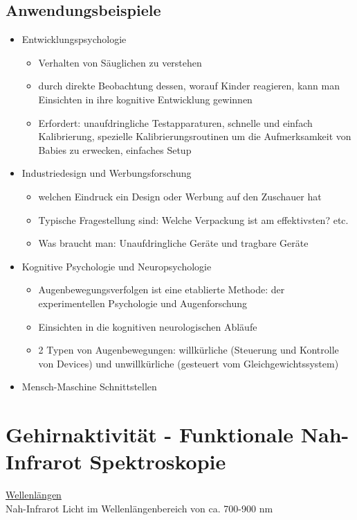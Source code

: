 \documentclass[a4paper,10pt,oneside]{article}
\begin{document}
\subsection{Anwendungsbeispiele}
	\begin{itemize}
		\item Entwicklungspsychologie
			\begin{itemize}
				\item Verhalten von Säuglichen zu verstehen
				\item durch direkte Beobachtung dessen, worauf Kinder reagieren, kann man Einsichten in ihre kognitive Entwicklung gewinnen
				\item Erfordert: unaufdringliche Testapparaturen, schnelle und einfach Kalibrierung, spezielle Kalibrierungsroutinen um die Aufmerksamkeit von Babies zu erwecken, einfaches Setup
			\end{itemize}
		\item Industriedesign und Werbungsforschung
			\begin{itemize}
				\item welchen Eindruck ein Design oder Werbung auf den Zuschauer hat
				\item Typische Fragestellung sind: Welche Verpackung ist am effektivsten? etc.
				\item Was braucht man: Unaufdringliche Geräte und tragbare Geräte
			\end{itemize}
		\item Kognitive Psychologie und Neuropsychologie
			\begin{itemize}
				\item Augenbewegungsverfolgen ist eine etablierte Methode: der experimentellen Psychologie und Augenforschung
				\item Einsichten in die kognitiven neurologischen Abläufe
				\item 2 Typen von Augenbewegungen: willkürliche (Steuerung und Kontrolle von Devices) und unwillkürliche (gesteuert vom Gleichgewichtssystem)
			\end{itemize}
		\item Mensch-Maschine Schnittstellen
	\end{itemize}
 
\section{Gehirnaktivität - Funktionale Nah-Infrarot Spektroskopie}
\underline{Wellenlängen} \\
Nah-Infrarot Licht im Wellenlängenbereich von ca. 700-900 nm
\end{document}
